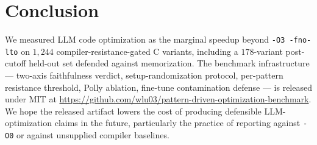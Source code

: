 \documentclass[conference]{IEEEtran}
\begin{document}
\section{Conclusion}\label{sec:conclusion}

We measured LLM code optimization as the marginal speedup beyond \texttt{-O3 -fno-lto} on $1{,}244$ compiler-resistance-gated C variants, including a $178$-variant post-cutoff held-out set defended against memorization. The benchmark infrastructure --- two-axis faithfulness verdict, setup-randomization protocol, per-pattern resistance threshold, Polly ablation, fine-tune contamination defense --- is released under MIT at \url{https://github.com/wlu03/pattern-driven-optimization-benchmark}. We hope the released artifact lowers the cost of producing defensible LLM-optimization claims in the future, particularly the practice of reporting against \texttt{-O0} or against unsupplied compiler baselines.

\end{document}
